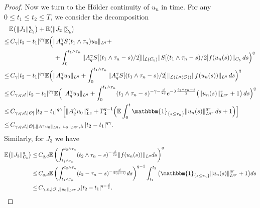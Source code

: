 \documentclass[10pt]{article}
\numberwithin{figure}{section}
\numberwithin{equation}{section}
\newcommand{\cL}{{\mathcal L}}
\newcommand{\0}{{\theta}}
\def\gam{\gamma}
\def\E{\mathbb{E}}
\def\Hs{\hspace{1cm}}\def\hs{\hspace{0.5cm}}
\def\({\left(}\def\){\right)}
\begin{document}
\begin{proof}
Now we turn to the H\"older continuity of $u_n$ in time. For any $0\le t_1\le t_2\le T$, we consider the decomposition
\begin{equation*}
\begin{split}
&\E\big(\|J_1\|_{C_b}^q\big)+\E\big(\| J_2\|_{C_b}^q\big)\\
\le&\,C_\gamma |t_2-t_1|^{q\gamma}
\E\Big(\|A_q^{\gamma}S(t_1\wedge\tau_n)u_0\|_{L^q}+\\
&\Hs\Hs\hs+\int_0^{t_1\wedge\tau_n}\|A_q^{\gamma}S[(t_1\wedge\tau_n-s)/2]\|_{\cL(C_b)}\|S[(t_1\wedge\tau_n-s)/2]f(u_n(s))\|_{C_b}\,ds\Big)^q\\
\le&\,C_\gamma |t_2-t_1|^{q\gamma}
\E\Big(\|A_q^{\gamma}u_0\|_{L^q}
+\int_0^{t_1\wedge\tau_n}\|A_q^{\gamma}S[(t_1\wedge\tau_n-s)/2]\|_{\mathcal L(L^q(\mathcal O))}\|f(u_n(s))\|_{L^q}\,ds\Big)^q\\
\le&\,C_{\gamma,q,d}\,|t_2-t_1|^{q\gamma}
\E\Big(\|A_q^{\gamma}u_0\|_{L^q}
+\int_0^{t_1\wedge\tau_n}(t_1\wedge\tau_n-s)^{-\gamma-\frac{d}{2q}}e^{-\lambda\frac{t_1\wedge\tau_n-s}{2}} \big( \| u_n(s) \|_{L^{qr}}^{r} + 1 \big)\,ds\Big)^q\\
\le&\,C_{\gamma,q,d,|\mathcal O|}\,|t_2-t_1|^{q\gamma}
\Big[\|A_q^{\gamma}u_0\|_{L^q}^q+\Gamma_4^{q-1}
         \Big(\E\int_0^t \mathbbm{1}_{\{s \le\tau_n\}} \| u_n(s) \|_{L^{qr}}^{qr} \, ds  +1\Big) \Big]\\
\le&\,C_{\gamma,q,d,|\mathcal O|,\|A^\gam u_0\|_{L^q},\|u_0\|_{L^{qr}},\lambda}\,|t_2-t_1|^{q\gamma}.
\end{split}
\end{equation*}
Similarly, for $J_3$ we have
\begin{equation*}
\begin{split}
\E\big(\|J_3\|_{C_b}^q\big) \le&\, C_{q,d}\E\(\int_{t_1\wedge\tau_n}^{t_2\wedge\tau_n}(t_2\wedge\tau_n-s)^{-\frac{d}{2q}}\|f(u_n(s))\|_{L^q}ds\)^q\\
\le&\,C_{q,d}\E\(\int_{t_1\wedge\tau_n}^{t_2\wedge\tau_n}(t_2-\tau_n-s)^{-\frac{d}{2(q-1)}}ds\)^{q-1}\int_{t_1}^{t_2}\big( \mathbbm{1}_{\{s\le\tau_n\}}\| u_n(s) \|_{L^{qr}}^{qr} + 1 \big)ds\\
\le&\, C_{\gamma,n,|\mathcal O|,\|u_0\|_{L^{qr}},\lambda}|t_2-t_1|^{q-\frac{d}{2}}.
\end{split}
\end{equation*}


\end{proof}
\end{document}
